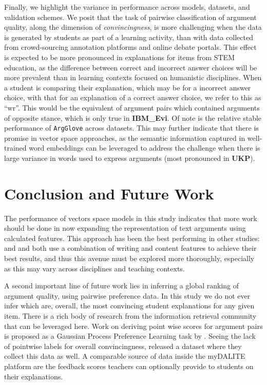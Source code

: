 \documentclass[runningheads]{llncs}
\begin{document}
Finally, we highlight the variance in performance across models, datasets, and 
validation schemes. We posit that the task of pairwise classification of 
argument quality, along the dimension of \textit{convincingness}, is more 
challenging when the data is generated by students as part of a learning 
activity, than with data collected from crowd-sourcing annotation platforms and 
online debate portals. 
This effect is expected to be more pronounced in explanations for items from 
STEM education, as the difference between correct and incorrect answer choices 
will be more prevalent than in learning contexts focused on humanistic 
disciplines.
When a student is comparing their explanation, which may be for a incorrect 
answer choice, with that for an explanation of a correct answer choice, we 
refer to this as ``wr''.
This would be the equivalent of argument pairs which contained arguments of 
opposite stance, which is only true in \textbf{IBM\_Evi}.  
Of note is the relative stable performance of \verb|ArgGlove| across datasets. 
This may further indicate that there is promise in vector space approaches, as 
the semantic information captured in well-trained word embeddings can be 
leveraged to address the challenge when there is large variance in words used 
to express arguments (most pronounced in \textbf{UKP}).


\section{Conclusion and Future Work}

The performance of vectors space models in this study indicates that more work 
should be done in now expanding the representation of text arguments using 
calculated features.
This approach has been the best performing in other studies: 
\cite{louis_what_2013} and \cite{nguyen_computational_2015} and both use a 
combination of writing and content features to achieve their best 
results, and thus this avenue must be explored more thoroughly, especially as 
this may vary across disciplines and teaching contexts. 

A second important line of future work lies in inferring a global ranking of 
argument quality, using pairwise preference data.
In this study we do not ever infer which are, overall, the most convincing 
student explanations for any given item. 
There is a rich body of research from the information retrieval 
community~\cite{chen_pairwise_2013} that can be leveraged here. 
Work on deriving point wise scores for argument pairs is proposed as a Gaussian 
Process Preference Learning task by \cite{simpson_finding_2018}. 
Seeing the lack of pointwise labels for overall convincingness, 
\cite{toledo_automatic_2019} released a dataset where they 
collect this data as well. 
A comparable source of data inside the myDALITE platform are the feedback 
scores teachers can optionally provide to students on their explanations.
\end{document}
